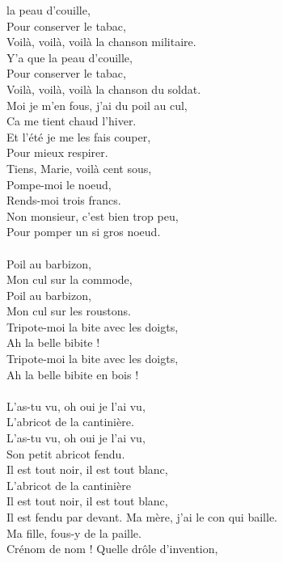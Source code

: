 
 la peau d'couille, 
\\Pour conserver le tabac,
\\Voilà, voilà, voilà la chanson militaire.
\\Y'a que la peau d'couille,
\\Pour conserver le tabac,
\\Voilà, voilà, voilà la chanson du soldat.
\\Moi je m'en fous, j'ai du poil au cul,
\\Ca me tient chaud l'hiver.
\\Et l'été je me les fais couper,
\\Pour mieux respirer.
\\Tiens, Marie, voilà cent sous,
\\Pompe-moi le noeud,
\\Rends-moi trois francs.
\\Non monsieur, c'est bien trop peu,
\\Pour pomper un si gros noeud.
\\\\Poil au barbizon, 
\\Mon cul sur la commode,
\\Poil au barbizon, 
\\Mon cul sur les roustons.
\\Tripote-moi la bite avec les doigts,
\\Ah la belle bibite !
\\Tripote-moi la bite avec les doigts,
\\Ah la belle bibite en bois !
\\\\L'as-tu vu, oh oui je l'ai vu,
\\L'abricot de la cantinière.
\\L'as-tu vu, oh oui je l'ai vu,
\\Son petit abricot fendu.
\\Il est tout noir, il est tout blanc,
\\L'abricot de la cantinière
\\Il est tout noir, il est tout blanc,
\\Il est fendu par devant.
\breakpage
Ma mère, j'ai le con qui baille.
\\Ma fille, fous-y de la paille.
\\Crénom de nom ! Quelle drôle d'invention,
